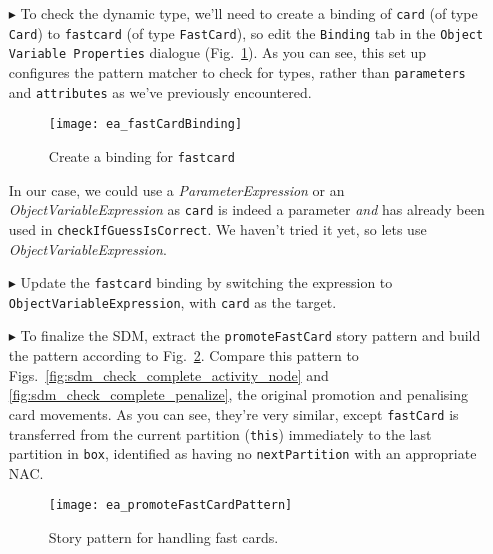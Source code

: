 \begin{itemize}
\vspace{0.5cm}
 
\item[$\blacktriangleright$] To check the dynamic type, we'll need to create a binding of \texttt{card} (of type \texttt{Card}) to \texttt{fastcard} (of
type \texttt{FastCard}), so edit the \texttt{Binding} tab in the \texttt{Object Variable Properties} dialogue (Fig.~\ref{fig:fastCardBinding}). As you can see,
this set up configures the pattern matcher to check for types, rather than \texttt{parameters} and \texttt{attributes} as we've previously encountered.
  
\begin{figure}[htbp]
\begin{center}
  \texttt{[image: ea\_fastCardBinding]}
  \caption{Create a binding for \texttt{fastcard}}  
  \label{fig:fastCardBinding}
\end{center}
\end{figure}

 \clearpage

In our case, we could use a \emph{ParameterExpression} or an \emph{ObjectVariableExpression} as \texttt{card} is indeed a parameter \emph{and} has already been
used in \texttt{checkIfGuessIsCorrect}. We haven't tried it yet, so lets use \emph{ObjectVariableExpression}.

\item[$\blacktriangleright$] Update the \texttt{fastcard} binding by switching the expression to 
\texttt{Object\-Vari\-able\-Ex\-pres\-sion}, with \texttt{card} as the target.

\vspace{0.5cm}

\item[$\blacktriangleright$] To finalize the SDM, extract the \texttt{promoteFastCard} story pattern and build the pattern according to
Fig.~\ref{fig:promoteFastCardPattern}. Compare this pattern to Figs.~\ref{fig:sdm_check_complete_activity_node} and \ref{fig:sdm_check_complete_penalize}, the
original promotion and penalising card movements. As you can see, they're very similar, except \texttt{fastCard} is transferred from the current partition
(\texttt{this}) immediately to the last partition in \texttt{box}, identified as having no \texttt{nextPartition} with an appropriate NAC.

\vspace{0.5cm}

\begin{figure}[htbp]
\begin{center}
  \texttt{[image: ea\_promoteFastCardPattern]}
  \caption{Story pattern for handling fast cards.}  
  \label{fig:promoteFastCardPattern}
\end{center}
\end{figure}


\end{itemize}
